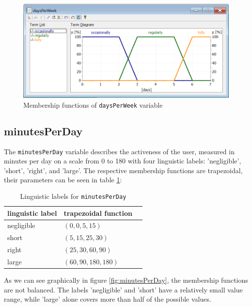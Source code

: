 \begin{figure}[H]
\centering
\includegraphics[width=\textwidth]{img/vDaysPerWeek}
\caption{Membership functions of \texttt{daysPerWeek} variable}
\label{fig:daysPerWeek} 
\end{figure}

\subsection{minutesPerDay}

The \texttt{minutesPerDay} variable describes the activeness of the user, measured in minutes per day on a scale from 0 to 180 with four linguistic labels: 'negligible', 'short', 'right',  and 'large'. The respective membership functions are trapezoidal, their parameters can be seen in table \ref{tab:minutesPerDay}:

\begin{table}[H]
\centering
\begin{tabular}{@{}lll@{}}
\toprule
\textbf{linguistic label}  & \textbf{trapezoidal function} \\ 
\midrule
negligible  & $(0,0,5,15)$ \\
short & $(5,15,25,30)$ \\
right & $(25,30,60,90)$ \\
large & $(60,90,180,180)$ \\
\bottomrule
\end{tabular}
\caption{Linguistic labels for \texttt{minutesPerDay}}
\label{tab:minutesPerDay}
\end{table}

As we can see graphically in figure \ref{fig:minutesPerDay}, the membership functions are not balanced. The labels 'negligible' and 'short' have a relatively small value range, while 'large' alone covers more than half of the possible values.

